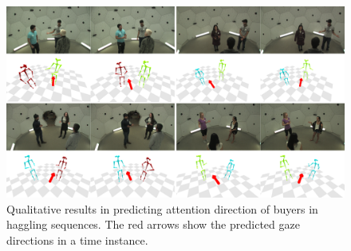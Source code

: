 \begin{figure}[t]
	\centering
	\includegraphics[width=\textwidth]{figures/gazepred_qualitative}
	\caption{Qualitative results in predicting attention direction of buyers in haggling sequences. The red arrows show the predicted gaze directions in a time instance.} 
	\label{fig:gazepred_qualitative}
\end{figure}


\pagebreak


%
%
%

